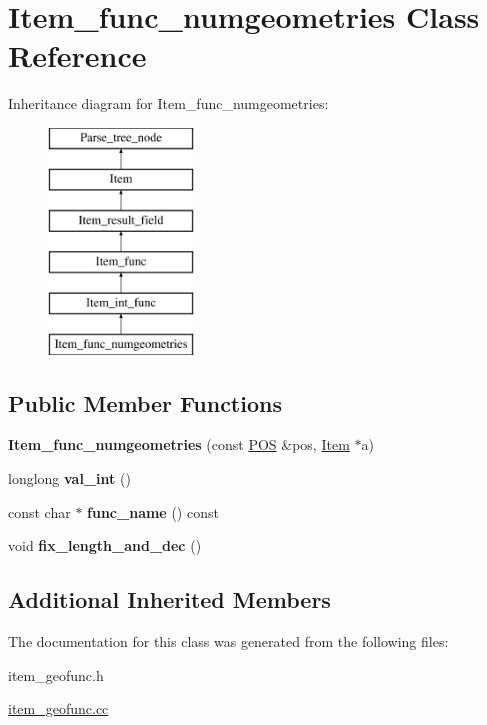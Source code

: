 \hypertarget{classItem__func__numgeometries}{}\section{Item\+\_\+func\+\_\+numgeometries Class Reference}
\label{classItem__func__numgeometries}
Inheritance diagram for Item\+\_\+func\+\_\+numgeometries\+:\begin{figure}[H]
\begin{center}
\leavevmode
\includegraphics[height=6.000000cm]{classItem__func__numgeometries}
\end{center}
\end{figure}
\subsection*{Public Member Functions}
\begin{DoxyCompactItemize}
\item 
\mbox{\label{classItem__func__numgeometries_a961f72dcf1f4900569e7cc3a928a2b53}} 
{\bfseries Item\+\_\+func\+\_\+numgeometries} (const \mbox{\hyperlink{structYYLTYPE}{P\+OS}} \&pos, \mbox{\hyperlink{classItem}{Item}} $\ast$a)
\item 
\mbox{\label{classItem__func__numgeometries_a4c63f1aff2e8963b9b6f1df141886fa7}} 
longlong {\bfseries val\+\_\+int} ()
\item 
\mbox{\label{classItem__func__numgeometries_acee0c4fd41e9e3e193aabaf6d9db59e6}} 
const char $\ast$ {\bfseries func\+\_\+name} () const
\item 
\mbox{\label{classItem__func__numgeometries_af0049520e442f92b5b0afeb48be6dd02}} 
void {\bfseries fix\+\_\+length\+\_\+and\+\_\+dec} ()
\end{DoxyCompactItemize}
\subsection*{Additional Inherited Members}


The documentation for this class was generated from the following files\+:\begin{DoxyCompactItemize}
\item 
item\+\_\+geofunc.\+h\item 
\mbox{\hyperlink{item__geofunc_8cc}{item\+\_\+geofunc.\+cc}}\end{DoxyCompactItemize}
